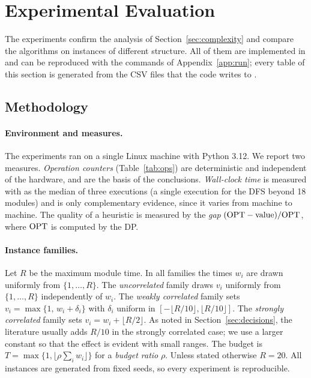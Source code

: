 \section{Experimental Evaluation}\label{sec:experiments}

The experiments confirm the analysis of Section~\ref{sec:complexity} and compare the algorithms on instances of different structure. All of them are implemented in  and can be reproduced with the commands of Appendix~\ref{app:run}; every table of this section is generated from the CSV files that the code writes to .

\subsection{Methodology}\label{sec:method}

\paragraph{Environment and measures.} The experiments ran on a single Linux machine with Python 3.12. We report two measures. \emph{Operation counters} (Table~\ref{tab:ops}) are deterministic and independent of the hardware, and are the basis of the conclusions. \emph{Wall-clock time} is measured with  as the median of three executions (a single execution for the DFS beyond 18 modules) and is only complementary evidence, since it varies from machine to machine. The quality of a heuristic is measured by the \emph{gap} $(\mathrm{OPT}-\mathrm{value})/\mathrm{OPT}$, where $\mathrm{OPT}$ is computed by the DP.

\paragraph{Instance families.} Let $R$ be the maximum module time. In all families the times $w_i$ are drawn uniformly from $\{1,\dots,R\}$. The \emph{uncorrelated} family draws $v_i$ uniformly from $\{1,\dots,R\}$ independently of $w_i$. The \emph{weakly correlated} family sets $v_i=\max\{1,\,w_i+\delta_i\}$ with $\delta_i$ uniform in $[-\lfloor R/10\rfloor,\lfloor R/10\rfloor]$. The \emph{strongly correlated} family sets $v_i=w_i+\lfloor R/2\rfloor$. As noted in Section~\ref{sec:decisions}, the literature usually adds $R/10$ in the strongly correlated case; we use a larger constant so that the effect is evident with small ranges. The budget is $T=\max\{1,\lfloor\rho\sum_iw_i\rfloor\}$ for a \emph{budget ratio} $\rho$. Unless stated otherwise $R=20$. All instances are generated from fixed seeds, so every experiment is reproducible.

